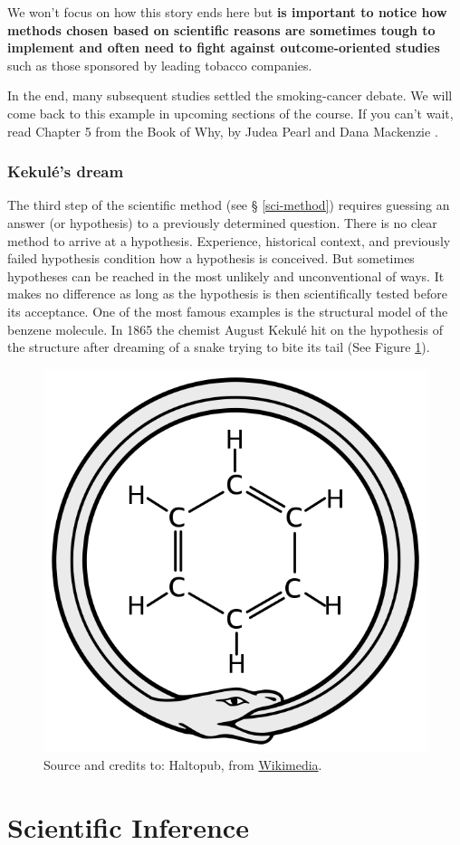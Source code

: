 \documentclass[
]{book}
\begin{document}
We won't focus on how this story ends here but \textbf{is important to notice how methods chosen based on scientific reasons are sometimes tough to implement and often need to fight against outcome-oriented studies} such as those sponsored by leading tobacco companies.

In the end, many subsequent studies settled the smoking-cancer debate. We will come back to this example in upcoming sections of the course. If you can't wait, read Chapter 5 from the Book of Why, by Judea Pearl and Dana Mackenzie \citep{book-of-why}.

\hypertarget{kekuluxe9s-dream}{%
\subsection{Kekulé's dream}\label{kekuluxe9s-dream}}

The third step of the scientific method (see § \ref{sci-method}) requires guessing an answer (or hypothesis) to a previously determined question. There is no clear method to arrive at a hypothesis. Experience, historical context, and previously failed hypothesis condition how a hypothesis is conceived. But sometimes hypotheses can be reached in the most unlikely and unconventional of ways. It makes no difference as long as the hypothesis is then scientifically tested before its acceptance. One of the most famous examples is the structural model of the benzene molecule. In 1865 the chemist August Kekulé hit on the hypothesis of the structure after dreaming of a snake trying to bite its tail (See Figure \ref{fig:ouroboros}).



\begin{figure}

{\centering \includegraphics[width=0.25\linewidth]{Figures/Ouroboros-benzene} 

}

\caption{Source and credits to: Haltopub, from \href{https://en.wikipedia.org/wiki/File:Ouroboros-benzene.svg}{Wikimedia}.}\label{fig:ouroboros}
\end{figure}

\hypertarget{scientific-inference}{%
\chapter{Scientific Inference}\label{scientific-inference}}
\end{document}

